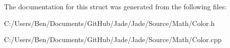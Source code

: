 The documentation for this struct was generated from the following files\+:\begin{DoxyCompactItemize}
\item 
C\+:/\+Users/\+Ben/\+Documents/\+Git\+Hub/\+Jade/\+Jade/\+Source/\+Math/Color.\+h\item 
C\+:/\+Users/\+Ben/\+Documents/\+Git\+Hub/\+Jade/\+Jade/\+Source/\+Math/Color.\+cpp\end{DoxyCompactItemize}
